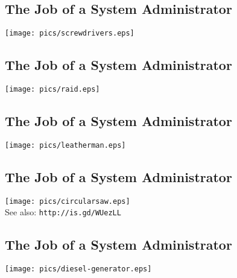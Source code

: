 \documentclass[xga]{xdvislides}
\begin{document}
\subsection{The Job of a System Administrator}
\vspace*{\fill}
\begin{center}
	\texttt{[image: pics/screwdrivers.eps]} \\
\end{center}
\vspace*{\fill}

\subsection{The Job of a System Administrator}
\vspace*{\fill}
\begin{center}
	\texttt{[image: pics/raid.eps]} \\
\end{center}
\vspace*{\fill}

\subsection{The Job of a System Administrator}
\vspace*{\fill}
\begin{center}
	\texttt{[image: pics/leatherman.eps]} \\
\end{center}
\vspace*{\fill}

\subsection{The Job of a System Administrator}
\vspace*{\fill}
\begin{center}
	\texttt{[image: pics/circularsaw.eps]} \\
	\small See also: {\tt http://is.gd/WUezLL} \Normalsize
\end{center}
\vspace*{\fill}

\subsection{The Job of a System Administrator}
\vspace*{\fill}
\begin{center}
	\texttt{[image: pics/diesel-generator.eps]} \\
\end{center}
\vspace*{\fill}
\end{document}
